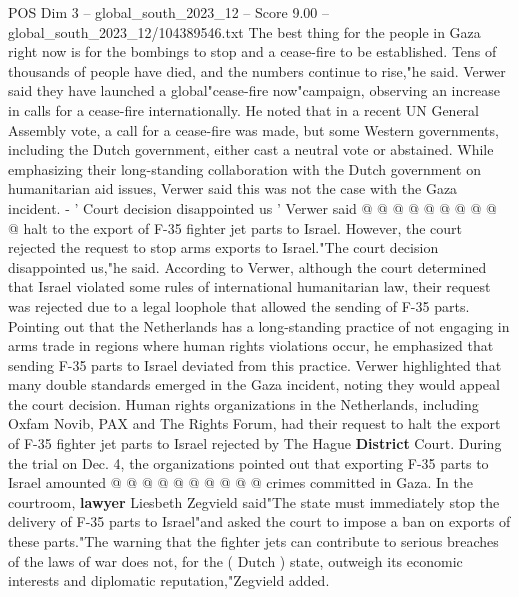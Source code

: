 \begin{textsample}{POS Dim 3 – global\_south\_2023\_12 – Score 9.00 – global\_south\_2023\_12/104389546.txt}
The best thing for the people in Gaza right now is for the bombings to stop and a cease-fire to be established.
Tens of thousands of people have died, and the numbers continue to rise,"he said.
Verwer said they have launched a global"cease-fire now"campaign, observing an increase in calls for a cease-fire internationally.
He noted that in a recent UN General Assembly vote, a call for a cease-fire was made, but some Western governments, including the Dutch government, either cast a neutral vote or abstained.
While emphasizing their long-standing collaboration with the Dutch government on humanitarian aid issues, Verwer said this was not the case with the Gaza incident. - ' Court decision disappointed us ' Verwer said @ @ @ @ @ @ @ @ @ @ halt to the export of F-35 fighter jet parts to Israel.
However, the court rejected the request to stop arms exports to Israel."The court decision disappointed us,"he said.
According to Verwer, although the court determined that Israel violated some rules of international humanitarian law, their request was rejected due to a legal loophole that allowed the sending of F-35 parts.
Pointing out that the Netherlands has a long-standing practice of not engaging in arms trade in regions where human rights violations occur, he emphasized that sending F-35 parts to Israel deviated from this practice.
Verwer highlighted that many double standards emerged in the Gaza incident, noting they would appeal the court decision.
Human rights organizations in the Netherlands, including Oxfam Novib, PAX and The Rights Forum, had their request to halt the export of F-35 fighter jet parts to Israel rejected by The Hague \textbf{District} Court.
During the trial on Dec. 4, the organizations pointed out that exporting F-35 parts to Israel amounted @ @ @ @ @ @ @ @ @ @ crimes committed in Gaza.
In the courtroom, \textbf{lawyer} Liesbeth Zegvield said"The state must immediately stop the delivery of F-35 parts to Israel"and asked the court to impose a ban on exports of these parts."The warning that the fighter jets can contribute to serious breaches of the laws of war does not, for the ( Dutch ) state, outweigh its economic interests and diplomatic reputation,"Zegvield added.

\end{textsample}
